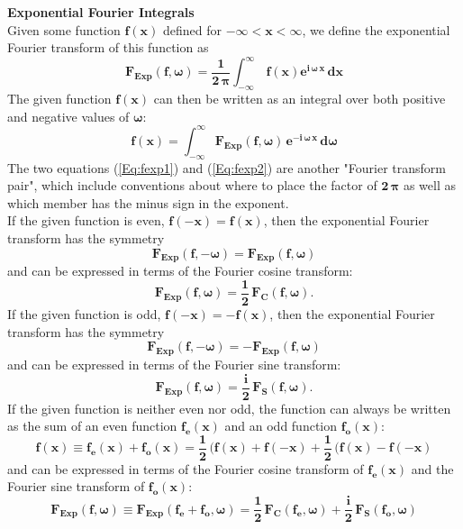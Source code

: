 \begin{compactitem}
\textbf{Exponential Fourier Integrals}\\
Given some function $\mathbf{f(x)}$ defined for $\mathbf{-\infty <x < \infty}$,
  we define the exponential Fourier transform  of this function as
\begin{equation}  \label{Eq:fexp1}
\mathbf{F_{Exp}(f,\boldsymbol{\omega}) = \frac{1}{2\, \boldsymbol{\pi}}
  \int_{-\infty}^{\infty} \,f(x) e^{i\,\boldsymbol{\omega}\,x}\,dx }
\end{equation}
The given function $\mathbf{f(x)}$ can then be written as an integral
  over both positive and negative values of $\boldsymbol{\omega}$:
\begin{equation}  \label{Eq:fexp2}
\mathbf{f(x) = \int_{-\infty}^{\infty} F_{Exp}(f,\boldsymbol{\omega})\,
    e^{-i\,\boldsymbol{\omega}\,x} \,d\boldsymbol{\omega} }
\end{equation}
The two equations (\ref{Eq:fexp1}) and (\ref{Eq:fexp2}) are another
   "Fourier transform pair", which include conventions about where
  to place the factor of $\mathbf{2\, \boldsymbol{\pi}}$ as well as which member
  has the minus sign in the exponent.\\

\noindent If the given function is even, $\mathbf{f(-x) = f(x) }$, then the
exponential Fourier transform has the symmetry
\begin{equation}
\mathbf{F_{Exp}(f,\boldsymbol{-\omega}) = F_{Exp}(f,\boldsymbol{\omega}) }
\end{equation}
and can be expressed in terms of the Fourier cosine transform:
\begin{equation}
\mathbf{F_{Exp}(f,\boldsymbol{\omega}) = \frac{1}{2} \, F_{C}(f,\boldsymbol{\omega})}.
\end{equation}
If the given function is odd, $\mathbf{f(-x) = -f(x) }$, then the
exponential Fourier transform has the symmetry
\begin{equation}
\mathbf{F_{Exp}(f,\boldsymbol{-\omega}) = -F_{Exp}(f,\boldsymbol{\omega}) }
\end{equation}
and can be expressed in terms of the Fourier sine transform:
\begin{equation}
\mathbf{F_{Exp}(f,\boldsymbol{\omega}) = \frac{i}{2} \, F_{S}(f,\boldsymbol{\omega})}.
\end{equation}
If the given function is neither even nor odd, the function can always be written
  as the sum of an even function $\mathbf{f_{e}(x)}$ and an odd function $\mathbf{f_{o}(x)}$:
\begin{equation}
\mathbf{f(x) \equiv f_{e}(x) + f_{o}(x) =
  \frac{1}{2} \,( f(x) + f(-x) + \frac{1}{2} \, ( f(x) - f(-x) }
\end{equation}
and can be expressed in terms of the Fourier cosine transform of $\mathbf{f_{e}(x)}$
  and the Fourier sine transform of $\mathbf{f_{o}(x)}$:
\begin{equation}
\mathbf{F_{Exp}(f,\boldsymbol{\omega}) \equiv F_{Exp}(f_{e}+f_{o},\boldsymbol{\omega}) =
  \frac{1}{2} \, F_{C}(f_{e},\boldsymbol{\omega}) +
  \frac{i}{2} \, F_{S}(f_{o},\boldsymbol{\omega}) }
\end{equation}



\end{compactitem}
